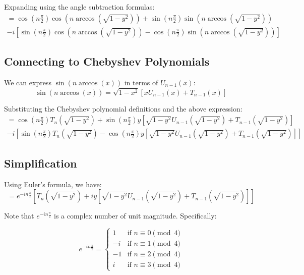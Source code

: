 \documentclass{article}
\begin{document}
Expanding using the angle subtraction formulas:
\begin{multline}
  = \cos (n\frac{\pi}{2}) \cos (n \arccos (\sqrt{1 - y^2})) + \sin (n\frac{\pi}{2}) \sin (n \arccos (\sqrt{1 - y^2})) \\
  - i [\sin (n\frac{\pi}{2}) \cos (n \arccos (\sqrt{1 - y^2})) - \cos (n\frac{\pi}{2}) \sin (n \arccos (\sqrt{1 - y^2}))]
\end{multline}

\subsection{Connecting to Chebyshev Polynomials}
We can express $\sin (n \arccos (x))$ in terms of $U_{n-1}(x)$:
\begin{equation}
  \sin (n \arccos (x)) = \sqrt{1 - x^2} [x U_{n-1}(x) + T_{n-1}(x)]
\end{equation}

Substituting the Chebyshev polynomial definitions and the above expression:
\begin{multline}
  = \cos (n\frac{\pi}{2}) T_n(\sqrt{1 - y^2}) + \sin (n\frac{\pi}{2}) y [\sqrt{1 - y^2} U_{n-1}(\sqrt{1 - y^2}) + T_{n-1}(\sqrt{1 - y^2})] \\
  - i [\sin (n\frac{\pi}{2}) T_n(\sqrt{1 - y^2}) - \cos (n\frac{\pi}{2}) y [\sqrt{1 - y^2} U_{n-1}(\sqrt{1 - y^2}) + T_{n-1}(\sqrt{1 - y^2})]]
\end{multline}

\subsection{Simplification}
Using Euler's formula, we have:
\begin{equation}
  = e^{-i n\frac{\pi}{2}} [T_n(\sqrt{1 - y^2}) + i y [\sqrt{1 - y^2} U_{n-1}(\sqrt{1 - y^2}) + T_{n-1}(\sqrt{1 - y^2})]]
\end{equation}

Note that $e^{-i n\frac{\pi}{2}}$ is a complex number of unit magnitude. Specifically:

\begin{equation}
  e^{-i n\frac{\pi}{2}} = 
  \begin{cases} 
    1 & \text{if } n \equiv 0 \pmod{4} \\
    -i & \text{if } n \equiv 1 \pmod{4} \\
    -1 & \text{if } n \equiv 2 \pmod{4} \\
    i & \text{if } n \equiv 3 \pmod{4}
  \end{cases}
\end{equation}
\end{document}
